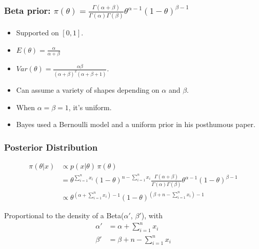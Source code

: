 \documentclass[12pt]{beamer}
\begin{document}
\begin{frame}
	\frametitle{Beta prior: $\pi(\theta) = \frac{\Gamma(\alpha+\beta)}{\Gamma(\alpha)\Gamma(\beta)}\theta^{\alpha-1}(1-\theta)^{\beta-1}$}
	
	\begin{itemize}[label={\color{blue}$\blacktriangleright$}]
		\item Supported on $[0,1]$.
		
		\item $E(\theta) = \frac{\alpha}{\alpha+\beta}$
		
		\item $Var(\theta) = \frac{\alpha\beta}{(\alpha+\beta)^2(\alpha+\beta+1)}$.
		
		\item Can assume a variety of shapes depending on $\alpha$ and $\beta$.
		
		\item When $\alpha = \beta = 1$, it's uniform.
		
		\item Bayes used a Bernoulli model and a uniform prior in his posthumous paper.
	\end{itemize}
	
\end{frame}
\begin{frame}
	\frametitle{Posterior Distribution}
	
	\begin{align*}
		\pi(\theta|x) &\propto p(x|\theta)\,\pi(\theta) \\[1em]
		&= \theta^{\sum_{i=1}^n x_i}(1-\theta)^{n-\sum_{i=1}^n x_i}\frac{\Gamma(\alpha+\beta)}{\Gamma(\alpha)\Gamma(\beta)}\theta^{\alpha-1}(1-\theta)^{\beta-1} \\[1em]
		&\propto \theta^{(\alpha+\sum_{i=1}^n x_i)-1}(1-\theta)^{(\beta+n-\sum_{i=1}^n x_i)-1}
	\end{align*}
	
	Proportional to the density of a Beta($\alpha'$, $\beta'$), with
	\[
	\begin{aligned}
		\alpha' &= \alpha + \sum_{i=1}^n x_i \\
		\beta' &= \beta + n - \sum_{i=1}^n x_i
	\end{aligned}
	\]
	
\end{frame}
\end{document}
